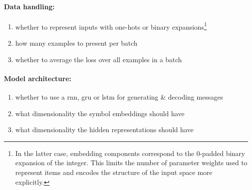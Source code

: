 \documentclass[twocolumn]{article}
\begin{document}
\vspace*{-0.5em}
\paragraph{Data handling:}
\begin{enumerate}[resume*]
    \vspace*{-0.5em}
    \itemsep-0.25em 
    \item whether to represent inputs with one-hots or binary expansions\footnote{
        In the latter case, embedding components correspond to the 0-padded binary expansion of the integer.
        This limits the number of parameter weights used to represent items and encodes the structure of the input space more explicitly.
    }
    \item \label{it:hp:batch} how many examples to present per batch
    \item \label{it:hp:avg} whether to average the loss over all examples in a batch
\end{enumerate}

\vspace*{-0.5em}
\paragraph{Model architecture:}
\begin{enumerate}[resume*]
    \vspace*{-0.5em}
    \itemsep-0.25em 
    \item whether to use a {\sc rnn}, {\sc gru} or {\sc lstm} for generating \& decoding messages
    \item what dimensionality the symbol embeddings should have
    \item what dimensionality the hidden representations should have
\end{enumerate}

\vspace*{-0.5em}
\end{document}
